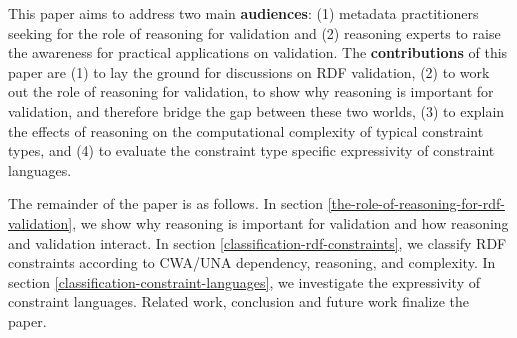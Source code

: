 \documentclass{llncs}
\begin{document}
This paper aims to address two main \textbf{audiences}: 
(1) metadata practitioners seeking for the role of reasoning for validation and
(2) reasoning experts to raise the awareness for practical applications on validation.
The \textbf{contributions} of this paper are
(1) to lay the ground for discussions on RDF validation,
(2) to work out the role of reasoning for validation, to show why reasoning is important for validation, and therefore bridge the gap between these two worlds,
(3) to explain the effects of reasoning on the computational complexity of typical constraint types, and
(4) to evaluate the constraint type specific expressivity of constraint languages.

The remainder of the paper is as follows.
In section \ref{the-role-of-reasoning-for-rdf-validation}, we show why reasoning is important for validation and how reasoning and validation interact.
In section \ref{classification-rdf-constraints}, we classify RDF constraints according to CWA/UNA dependency, reasoning, and complexity.
In section \ref{classification-constraint-languages}, we investigate the expressivity of constraint languages. 
Related work, conclusion and future work finalize the paper.


\end{document}
